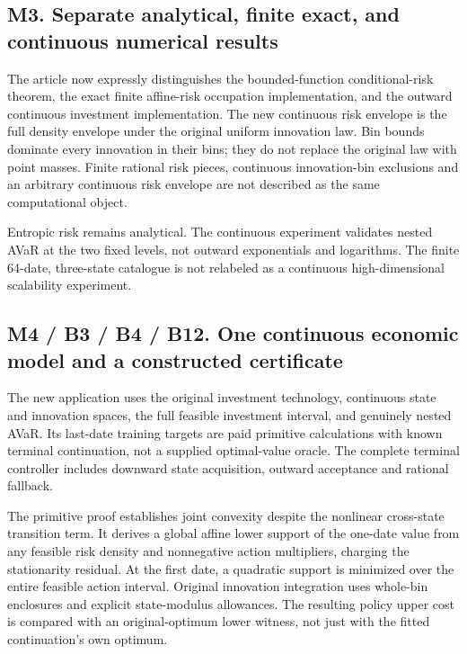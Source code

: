 \hypertarget{m3.-separate-analytical-finite-exact-and-continuous-numerical-results}{%
\subsection{M3. Separate analytical, finite exact, and continuous
numerical
results}\label{m3.-separate-analytical-finite-exact-and-continuous-numerical-results}}

The article now expressly distinguishes the bounded-function
conditional-risk theorem, the exact finite affine-risk occupation
implementation, and the outward continuous investment implementation.
The new continuous risk envelope is the full density envelope under the
original uniform innovation law. Bin bounds dominate every innovation in
their bins; they do not replace the original law with point masses.
Finite rational risk pieces, continuous innovation-bin exclusions and an
arbitrary continuous risk envelope are not described as the same
computational object.

Entropic risk remains analytical. The continuous experiment validates
nested AVaR at the two fixed levels, not outward exponentials and
logarithms. The finite 64-date, three-state catalogue is not relabeled
as a continuous high-dimensional scalability experiment.

\hypertarget{m4-b3-b4-b12.-one-continuous-economic-model-and-a-constructed-certificate}{%
\subsection{M4 / B3 / B4 / B12. One continuous economic model and a
constructed
certificate}\label{m4-b3-b4-b12.-one-continuous-economic-model-and-a-constructed-certificate}}

The new application uses the original investment technology, continuous
state and innovation spaces, the full feasible investment interval, and
genuinely nested AVaR. Its last-date training targets are paid primitive
calculations with known terminal continuation, not a supplied
optimal-value oracle. The complete terminal controller includes downward
state acquisition, outward acceptance and rational fallback.

The primitive proof establishes joint convexity despite the nonlinear
cross-state transition term. It derives a global affine lower support of
the one-date value from any feasible risk density and nonnegative action
multipliers, charging the stationarity residual. At the first date, a
quadratic support is minimized over the entire feasible action interval.
Original innovation integration uses whole-bin enclosures and explicit
state-modulus allowances. The resulting policy upper cost is compared
with an original-optimum lower witness, not just with the fitted
continuation's own optimum.

